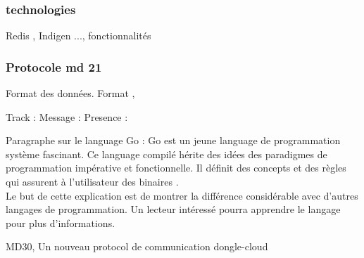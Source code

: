         \subsubsection{technologies}
        Redis , Indigen ..., fonctionnalités 
        \subsubsection{Protocole md 21 }
        

        Format des données.
        Format , 

        Track : 
        Message : 
        Presence : 
        


        Paragraphe sur le language Go : 
        Go est un jeune language de programmation système
        fascinant. Ce language compilé hérite des idées des paradigmes de
        programmation impérative et fonctionnelle. Il définit des concepts et
        des règles qui assurent à l'utilisateur des binaires .\\[0.3cm]
       
      
        Le but de cette explication est de montrer la différence considérable
        avec d'autres langages de programmation. Un lecteur intéressé pourra
        apprendre le langage pour plus d'informations.

        MD30, Un nouveau protocol de communication dongle-cloud